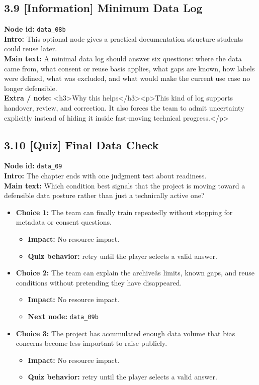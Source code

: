 \documentclass[11pt]{article}
\begin{document}
\subsection*{3.9 [Information] Minimum Data Log}
\textbf{Node id:} \texttt{data\_08b}\\
\textbf{Intro:} This optional node gives a practical documentation structure students could reuse later.\\
\textbf{Main text:} A minimal data log should answer six questions: where the data came from, what consent or reuse basis applies, what gaps are known, how labels were defined, what was excluded, and what would make the current use case no longer defensible.\\
\textbf{Extra / note:} <h3>Why this helps</h3><p>This kind of log supports handover, review, and correction. It also forces the team to admit uncertainty explicitly instead of hiding it inside fast-moving technical progress.</p>\\
\subsection*{3.10 [Quiz] Final Data Check}
\textbf{Node id:} \texttt{data\_09}\\
\textbf{Intro:} The chapter ends with one judgment test about readiness.\\
\textbf{Main text:} Which condition best signals that the project is moving toward a defensible data posture rather than just a technically active one?\\
\begin{itemize}
\item \textbf{Choice 1:} The team can finally train repeatedly without stopping for metadata or consent questions.
\begin{itemize}
\item \textbf{Impact:} No resource impact.
\item \textbf{Quiz behavior:} retry until the player selects a valid answer.
\end{itemize}
\item \textbf{Choice 2:} The team can explain the archiveâs limits, known gaps, and reuse conditions without pretending they have disappeared.
\begin{itemize}
\item \textbf{Impact:} No resource impact.
\item \textbf{Next node:} \texttt{data\_09b}
\end{itemize}
\item \textbf{Choice 3:} The project has accumulated enough data volume that bias concerns become less important to raise publicly.
\begin{itemize}
\item \textbf{Impact:} No resource impact.
\item \textbf{Quiz behavior:} retry until the player selects a valid answer.
\end{itemize}
\end{itemize}
\end{document}
